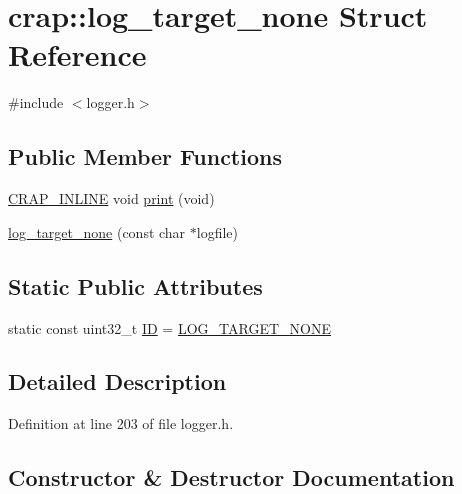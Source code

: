 \hypertarget{structcrap_1_1log__target__none}{}\section{crap\+:\+:log\+\_\+target\+\_\+none Struct Reference}
\label{structcrap_1_1log__target__none}


{\ttfamily \#include $<$logger.\+h$>$}

\subsection*{Public Member Functions}
\begin{DoxyCompactItemize}
\item 
\hyperlink{config__x86_8h_a5a40526b8d842e7ff731509998bb0f1c}{C\+R\+A\+P\+\_\+\+I\+N\+L\+I\+N\+E} void \hyperlink{structcrap_1_1log__target__none_a70b3621a5eddfc8383c4f074bc0901dc}{print} (void)
\item 
\hyperlink{structcrap_1_1log__target__none_a984b631178aafb194e76aa15a322d27e}{log\+\_\+target\+\_\+none} (const char $\ast$logfile)
\end{DoxyCompactItemize}
\subsection*{Static Public Attributes}
\begin{DoxyCompactItemize}
\item 
static const uint32\+\_\+t \hyperlink{structcrap_1_1log__target__none_a18e17216de74467e62adc28d1a86c941}{I\+D} = \hyperlink{logger_8h_a9235b8d7801877c99589aab3edcf05fd}{L\+O\+G\+\_\+\+T\+A\+R\+G\+E\+T\+\_\+\+N\+O\+N\+E}
\end{DoxyCompactItemize}


\subsection{Detailed Description}


Definition at line 203 of file logger.\+h.



\subsection{Constructor \& Destructor Documentation}
\hypertarget{structcrap_1_1log__target__none_a984b631178aafb194e76aa15a322d27e}{}
